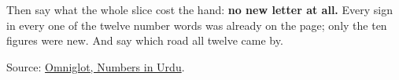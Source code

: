 Then say what the whole slice cost the hand: \textbf{no new letter at all.} Every sign in every one of the twelve number words was already on the page; only the ten figures were new. And say which road all twelve came by.

\begin{tcolorbox}[breakable,colback=teal!4,colframe=teal!35!black,title={Before you move on}]
Source: \href{https://www.omniglot.com/language/numbers/urdu.htm}{Omniglot, Numbers in Urdu}.
\end{tcolorbox}

